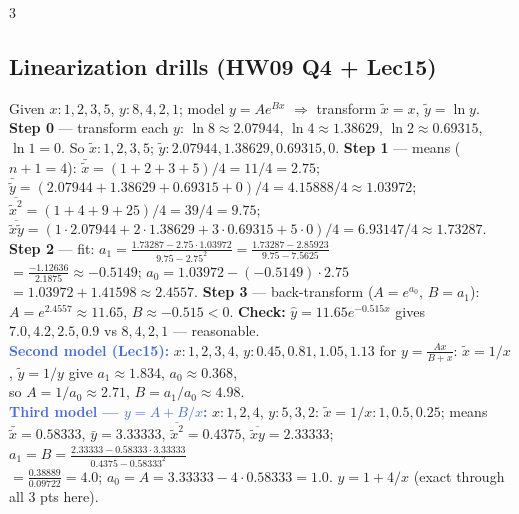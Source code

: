 \documentclass[9pt]{extarticle}
\newcommand{\wk}[1]{\textbf{\textcolor{OliveGreen}{#1}}}
\newcommand{\ex}[1]{\textbf{\textcolor{RoyalBlue}{#1}}}
\begin{document}
\begin{multicols}{3}
\begin{sloppypar}
\subsection{Linearization drills (HW09 Q4 + Lec15)}
Given $x:1,2,3,5$, $y:8,4,2,1$; model $y=Ae^{Bx}$ $\Rightarrow$ transform $\tilde x=x$, $\tilde y=\ln y$.
\wk{Step 0} — transform each $y$: $\ln8\approx2.07944$, $\ln4\approx1.38629$, $\ln2\approx0.69315$, $\ln1=0$. So $\tilde x:1,2,3,5$; $\tilde y:2.07944,1.38629,0.69315,0$.
\wk{Step 1} — means ($n{+}1{=}4$): $\bar{\tilde x}=(1{+}2{+}3{+}5)/4=11/4=2.75$; $\bar{\tilde y}=(2.07944{+}1.38629{+}0.69315{+}0)/4=4.15888/4\approx1.03972$; $\overline{\tilde x^2}=(1{+}4{+}9{+}25)/4=39/4=9.75$; $\overline{\tilde x\tilde y}=(1\cdot2.07944{+}2\cdot1.38629{+}3\cdot0.69315{+}5\cdot0)/4=6.93147/4\approx1.73287$.
\wk{Step 2} — fit: $a_1=\tfrac{1.73287-2.75\cdot1.03972}{9.75-2.75^2}=\tfrac{1.73287-2.85923}{9.75-7.5625}$\\
$=\tfrac{-1.12636}{2.1875}\approx-0.5149$; $a_0=1.03972-(-0.5149)\cdot2.75$\\
$=1.03972+1.41598\approx2.4557$.
\wk{Step 3} — back-transform ($A=e^{a_0}$, $B=a_1$): $A=e^{2.4557}\approx11.65$, $B\approx-0.515<0$. \wk{Check:} $\hat y=11.65e^{-0.515x}$ gives $7.0,4.2,2.5,0.9$ vs $8,4,2,1$ — reasonable.\\
\ex{Second model (Lec15):} $x:1,2,3,4$, $y:0.45,0.81,1.05,1.13$ for $y=\tfrac{Ax}{B+x}$: $\tilde x=1/x$, $\tilde y=1/y$ give $a_1\approx1.834$, $a_0\approx0.368$,\\
so $A=1/a_0\approx2.71$, $B=a_1/a_0\approx4.98$.\\
\ex{Third model — $y=A+B/x$:} $x:1,2,4$, $y:5,3,2$: $\tilde x=1/x:1,0.5,0.25$; means $\bar{\tilde x}=0.58333$, $\bar y=3.33333$, $\overline{\tilde x^2}=0.4375$, $\overline{\tilde x y}=2.33333$; $a_1=B=\tfrac{2.33333-0.58333\cdot3.33333}{0.4375-0.58333^2}$\\
$=\tfrac{0.38889}{0.09722}=4.0$; $a_0=A=3.33333-4\cdot0.58333=1.0$. $\boxed{y=1+4/x}$ (exact through all 3 pts here).


\end{sloppypar}
\end{multicols}
\end{document}
